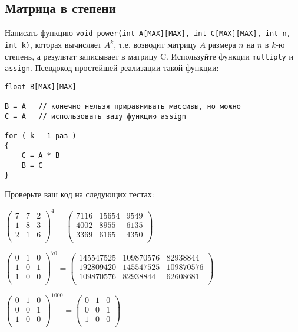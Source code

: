 \documentclass[10pt]{article}
\begin{document}
\subsection{Матрица в степени}
Написать функцию \texttt{void power(int A[MAX][MAX], int C[MAX][MAX], int n, int k)}, которая вычисляет $A^k$, т.е. возводит матрицу $A$ размера $n$ на $n$ в $k$-ю степень, а результат записывает в матрицу C. Используйте функции \texttt{multiply} и \texttt{assign}. Псевдокод простейшей реализации такой функции:
\begin{lstlisting}
float B[MAX][MAX]

B = A   // конечно нельзя приравнивать массивы, но можно 
C = A   // использовать вашу функцию assign

for ( k - 1 раз )
{
	C = A * B
	B = C
}
\end{lstlisting}
Проверьте ваш код на следующих тестах:
\begin{center}

$
\begin{pmatrix}
7 & 7 & 2 \\
1 & 8 & 3 \\
2 & 1 & 6 \\
\end{pmatrix}^4 = 
\begin{pmatrix}
7116 & 15654 & 9549 \\
4002 & 8955 & 6135 \\
3369 & 6165 & 4350 \\
\end{pmatrix}
$
\end{center}



\begin{center}
$
\begin{pmatrix}
0 & 1 & 0 \\
1 & 0 & 1 \\
1 & 0 & 0 \\
\end{pmatrix}^{70} = 
\begin{pmatrix}
145547525 & 109870576 & 82938844 \\
192809420 & 145547525 & 109870576 \\
109870576 & 82938844 & 62608681 \\
\end{pmatrix}
$
\end{center}

\begin{center}
$
\begin{pmatrix}
0 & 1 & 0 \\
0 & 0 & 1 \\
1 & 0 & 0 \\
\end{pmatrix}^{1000} = 
\begin{pmatrix}
0 & 1 & 0 \\
0 & 0 & 1 \\
1 & 0 & 0 \\
\end{pmatrix}
$
\end{center}
\end{document}
